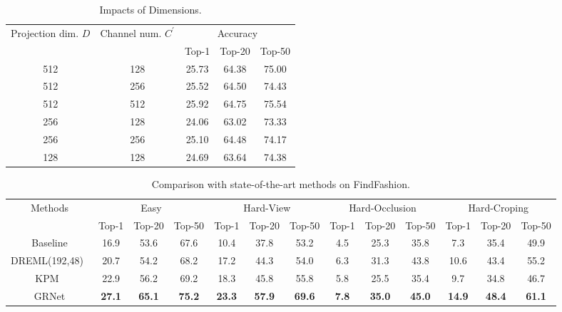 \documentclass[10pt,twocolumn,letterpaper]{article}
\begin{document}
\begin{table}
\footnotesize
\center
\begin{center}
\begin{tabular}{c|c|c|c|c}
\hline
\multirow{2}{*}{Projection dim. $D$} &  \multirow{2}{*}{Channel num. $C^{'}$} &\multicolumn{3}{|c}{Accuracy} \\ \cline{3-5}
&&Top-1&Top-20&Top-50 \\ \hline
512&128&25.73&64.38&75.00  \\
512&256&25.52&64.50& 74.43 \\
512&512&25.92&64.75& 75.54 \\ \hline
256&128&24.06&63.02&73.33  \\
256&256&25.10&64.48& 74.17 \\ \hline
128&128&24.69&63.64&74.38
\\
\hline
\end{tabular}
 \vspace{-2mm}
\end{center}
\caption{Impacts of Dimensions.}
\label{tab:table_dim}
\end{table}
\begin{table*}[!htp]
\footnotesize
\center
\begin{center}
\begin{tabular}{c
|c|c|c
|c|c|c
|c|c|c
|c|c|c
}
\hline
\multirow{2}{*}{Methods} & \multicolumn{3}{|c|}{Easy}&\multicolumn{3}{|c|}{Hard-View}&\multicolumn{3}{|c|}{Hard-Occlusion}&\multicolumn{3}{|c}{Hard-Croping} \\ \cline{2-13}
&Top-1&Top-20&Top-50&Top-1&Top-20&Top-50&Top-1&Top-20&Top-50&Top-1&Top-20&Top-50 \\ \hline
Baseline &16.9 &53.6 &67.6 &10.4 &37.8 &53.2   & 4.5  &25.3 &35.8 &7.3 &35.4 &49.9 \\
DREML(192,48)~\cite{Xuan2018}         &20.7 &54.2 &68.2 &17.2 &44.3 &54.0 & 6.3 & 31.3 &43.8 &10.6 &43.4 &55.2 \\
KPM~\cite{Shen_2018_CVPR}         &22.9 &56.2 &69.2 &18.3 &45.8 &55.8 &5.8 &25.5 &35.4 &9.7 &34.8 &46.7 \\
GRNet&\textbf{27.1}&\textbf{65.1}&\textbf{75.2}
& \textbf{23.3}&\textbf{57.9}&\textbf{69.6}&
\textbf{7.8}&\textbf{35.0}&\textbf{45.0}
&\textbf{14.9}&\textbf{48.4}&\textbf{61.1}   \\
\hline
\end{tabular}
\vspace{-2mm}
\end{center}
\caption{Comparison with state-of-the-art methods on FindFashion.}
\label{tab:table_findfashion}
\end{table*}
\end{document}
